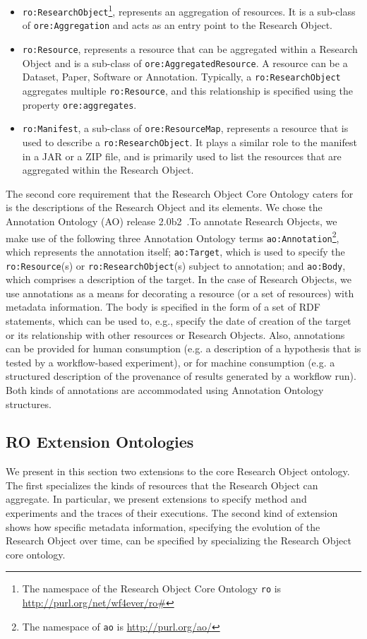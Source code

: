 \begin{itemize}
\item
\texttt{ro:ResearchObject}\footnote{The namespace of the Research Object Core Ontology \texttt{ro} is \url{http://purl.org/net/wf4ever/ro\#}}, represents an aggregation of resources. It is a sub-class of \texttt{ore:Aggregation} and acts as an entry point to the Research Object.
\item
\texttt{ro:Resource}, represents a resource that can be aggregated within a Research Object and is a sub-class of \texttt{ore:AggregatedResource}. A resource can be a Dataset, Paper, Software or Annotation. Typically, a \texttt{ro:ResearchObject} aggregates multiple \texttt{ro:Resource}, and this relationship is specified using the property \texttt{ore:aggregates}.
\item
\texttt{ro:Manifest}, a sub-class of \texttt{ore:ResourceMap}, represents a resource that is used to describe a \texttt{ro:ResearchObject}. It plays a similar role to the manifest in a JAR or a ZIP file, and is primarily used to list the resources that are aggregated within the Research Object.
\end{itemize}

The second core requirement that the Research Object Core Ontology caters for is the descriptions of the Research Object and its elements. We chose the Annotation Ontology (AO) release 2.0b2~\cite{COG11}.To annotate Research Objects, we make use of the following three Annotation Ontology terms \texttt{ao:Annotation}\footnote{The namespace of \texttt{ao} is \url{http://purl.org/ao/}}, which represents the annotation itself; \texttt{ao:Target}, which is used to specify the \texttt{ro:Resource}(s) or \texttt{ro:ResearchObject}(s) subject to annotation; and \texttt{ao:Body}, which comprises a description of the target.
In the case of Research Objects, we use annotations as a means for decorating a resource (or a set of resources) with metadata information. The body is specified in the form of a set of RDF statements, which can be used to, e.g., specify  the date of creation of the target or its relationship with other resources or Research Objects. Also, annotations can be provided for human consumption (e.g. a description of a hypothesis that is tested by a workflow-based experiment), or for machine consumption (e.g. a structured description of the provenance of results generated by a workflow run). Both kinds of annotations are accommodated using Annotation Ontology structures.

\subsection{RO Extension Ontologies}
We present in this section two  extensions to the core Research Object ontology. The first specializes the kinds of resources that the Research Object can aggregate. In particular, we present extensions to specify  method and experiments and the traces of their executions. The second kind of extension shows how specific metadata information, specifying the evolution of the Research Object over time, can be specified by specializing the Research Object core ontology.

